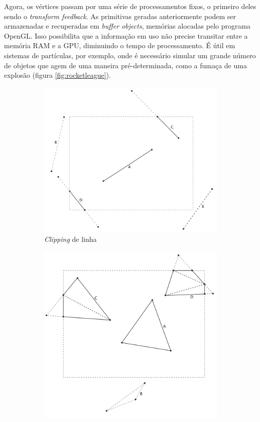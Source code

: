Agora, os vértices passam por uma série de processamentos fixos, o primeiro deles sendo o \textit{transform feedback}. As primitivas geradas anteriormente podem ser armazenadas e recuperadas em \textit{buffer objects}, memórias alocadas pelo programa OpenGL. Isso possibilita que a informação em uso não precise transitar entre a memória RAM e a GPU, diminuindo o tempo de processamento. É útil em sistemas de partículas, por exemplo, onde é necessário simular um grande número de objetos que agem de uma maneira pré-determinada, como a fumaça de uma explosão (figura \ref{fig:rocketleague}).

\begin{figure}[H]
	\begin{subfigure}[b]{0.4\textwidth}
		\includegraphics[width=\textwidth]{imagens/line-clipping.png}
		\caption[Clipping de linha]{\textit{Clipping} de linha}
		\label{fig:lineclipping}
	\end{subfigure}
	\hfill
	\begin{subfigure}[b]{0.4\textwidth}
		\includegraphics[width=\textwidth]{imagens/triangle-clipping.png}

\end{subfigure}
\end{figure}

